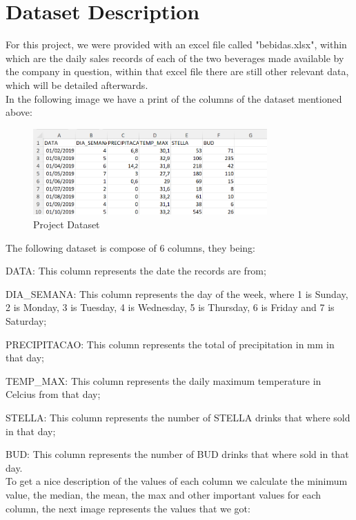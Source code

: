\newpage

\section{Dataset Description}

\quad For this project, we were provided with an excel file called "bebidas.xlsx", within which are the daily sales records of each of the two beverages made available by the company in question, within that excel file there are still other relevant data, which will be detailed afterwards. \\

In the following image we have a print of the columns of the dataset mentioned above:

\begin{figure}[H]
    \centering
    \includegraphics[width=0.8\textwidth]{assets/dataset.png}
    \caption{Project Dataset}
    \label{fig:dataset}
    \end{figure}


The following dataset is compose of 6 columns, they being:

\quad \textbullet DATA: This column represents the date the records are from;

\quad \textbullet DIA\_SEMANA: This column represents the day of the week, where 1 is Sunday, 2 is Monday, 3 is Tuesday, 4 is Wednesday, 5 is Thursday, 6 is Friday and 7 is Saturday;

\quad \textbullet PRECIPITACAO: This column represents the total of precipitation in mm in that day;

\quad \textbullet TEMP\_MAX: This column represents the daily maximum temperature in Celcius from that day;

\quad \textbullet STELLA: This column represents the number of STELLA drinks that where sold in that day;

\quad \textbullet BUD: This column represents the number of BUD drinks that where sold in that day.\\

To get a nice description of the values of each column we calculate the minimum value, the median, the mean, the max and other important values for each column, the next image represents the values that we got:\\

